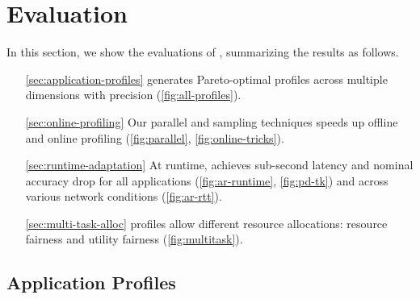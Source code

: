 \section{Evaluation}
\label{sec:evaluation}

In this section, we show the evaluations of \sysname{}, summarizing the results
as follows.

\begin{itemize}[leftmargin=1.5cm]
\item[\autoref{sec:application-profiles}] \sysname{} generates Pareto-optimal
  profiles across multiple dimensions with precision
  (\autoref{fig:all-profiles}).
\item[\autoref{sec:online-profiling}] Our parallel and sampling techniques
  speeds up offline and online profiling (\autoref{fig:parallel},
  \autoref{fig:online-tricks}).
\item[\autoref{sec:runtime-adaptation}] At runtime, \sysname{} achieves
  sub-second latency and nominal accuracy drop for all applications
  (\autoref{fig:ar-runtime}, \autoref{fig:pd-tk}) and across various network
  conditions (\autoref{fig:ar-rtt}).
\item[\autoref{sec:multi-task-alloc}] \sysname{} profiles allow different
  resource allocations: resource fairness and utility fairness
  (\autoref{fig:multitask}).
\end{itemize}

\subsection{Application Profiles}
\label{sec:application-profiles}

